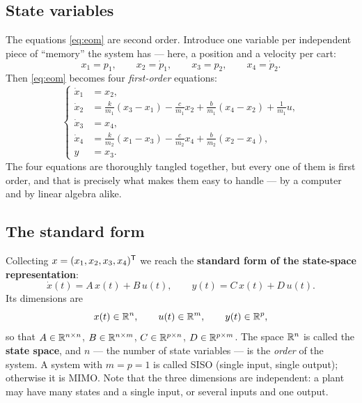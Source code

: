\documentclass[11pt]{article}
\begin{document}
\subsection{State variables}
The equations \eqref{eq:eom} are second order. Introduce one variable per
independent piece of ``memory'' the system has --- here, a position and a velocity
per cart:
\[
   x_1 = p_1,\qquad x_2=\dot p_1,\qquad x_3=p_2,\qquad x_4=\dot p_2 .
\]
Then \eqref{eq:eom} becomes four \emph{first-order} equations:
\begin{equation}\label{eq:statelines}
\left\{
\begin{aligned}
   \dot x_1 &= x_2, \\
   \dot x_2 &= \frac{k}{m_1}(x_3-x_1) - \frac{c}{m_1}x_2 + \frac{b}{m_1}(x_4-x_2) + \frac{1}{m_1}u, \\
   \dot x_3 &= x_4, \\
   \dot x_4 &= \frac{k}{m_2}(x_1-x_3) - \frac{c}{m_2}x_4 + \frac{b}{m_2}(x_2-x_4), \\
   y &= x_3 .
\end{aligned}\right.
\end{equation}
The four equations are thoroughly tangled together, but every one of them is
first order, and that is precisely what makes them easy to handle --- by a
computer and by linear algebra alike.

\subsection{The standard form}\label{sec:stdform}
Collecting $x=(x_1,x_2,x_3,x_4)^{\mathsf{T}}$ we reach the \textbf{standard form of the
state-space representation}:
\begin{equation}\label{eq:std}
   \boxed{\;\dot x(t) = A\,x(t) + B\,u(t),\qquad y(t) = C\,x(t) + D\,u(t).\;}
\end{equation}
Its dimensions are
\begin{equation}\label{eq:dims}
   x(t)\in\mathbb{R}^{n},\qquad u(t)\in\mathbb{R}^{m},\qquad y(t)\in\mathbb{R}^{p},
\end{equation}
so that $A\in\mathbb{R}^{n\times n}$, $B\in\mathbb{R}^{n\times m}$, $C\in\mathbb{R}^{p\times n}$,
$D\in\mathbb{R}^{p\times m}$. The space $\mathbb{R}^{n}$ is called the \textbf{state space}, and
$n$ --- the number of state variables --- is the \emph{order} of the system. A
system with $m=p=1$ is called SISO (single input, single output); otherwise it
is MIMO. Note that the three dimensions are independent: a plant may have many
states and a single input, or several inputs and one output.
\end{document}
